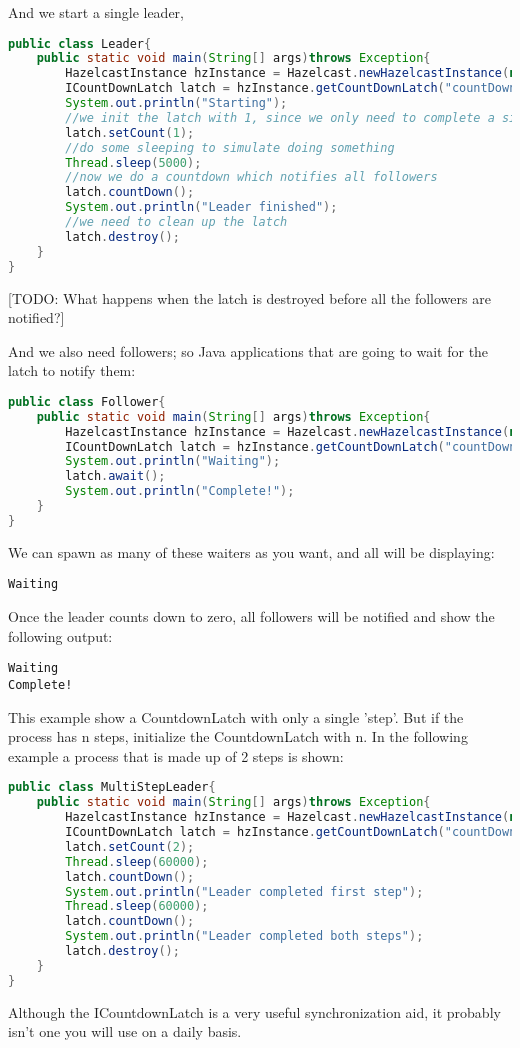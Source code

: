 And we start a single leader, 
\begin{lstlisting}[language=java]
public class Leader{
    public static void main(String[] args)throws Exception{
        HazelcastInstance hzInstance = Hazelcast.newHazelcastInstance(null);
        ICountDownLatch latch = hzInstance.getCountDownLatch("countDownLatch");      
        System.out.println("Starting");
        //we init the latch with 1, since we only need to complete a single step.
        latch.setCount(1); 
        //do some sleeping to simulate doing something    
        Thread.sleep(5000);
        //now we do a countdown which notifies all followers
        latch.countDown();
        System.out.println("Leader finished");
        //we need to clean up the latch
        latch.destroy();
    }
}
\end{lstlisting}

[TODO: What happens when the latch is destroyed before all the followers are notified?]

And we also need followers; so Java applications that are going to wait for the latch to notify them:
\begin{lstlisting}[language=java]
public class Follower{
    public static void main(String[] args)throws Exception{
        HazelcastInstance hzInstance = Hazelcast.newHazelcastInstance(null); 
        ICountDownLatch latch = hzInstance.getCountDownLatch("countDownLatch");
        System.out.println("Waiting");
        latch.await();
        System.out.println("Complete!");
    }
}
\end{lstlisting}
We can spawn as many of these waiters as you want, and all will be displaying:
\begin{lstlisting}
Waiting
\end{lstlisting}
Once the leader counts down to zero, all followers will be notified and show the following output:
\begin{lstlisting}
Waiting
Complete!
\end{lstlisting}
This example show a CountdownLatch with only a single 'step'. But if the process has n steps, initialize the CountdownLatch with n. In the following example a process that is made up of 2 steps is shown:
\begin{lstlisting}[language=java]
public class MultiStepLeader{
    public static void main(String[] args)throws Exception{
        HazelcastInstance hzInstance = Hazelcast.newHazelcastInstance(null);
        ICountDownLatch latch = hzInstance.getCountDownLatch("countDownLatch");
        latch.setCount(2);
        Thread.sleep(60000); 
        latch.countDown();
        System.out.println("Leader completed first step");      
        Thread.sleep(60000); 
        latch.countDown();
        System.out.println("Leader completed both steps");
        latch.destroy();
    }
}
\end{lstlisting}
Although the ICountdownLatch is a very useful synchronization aid, it probably isn't one you will use on a daily basis.

